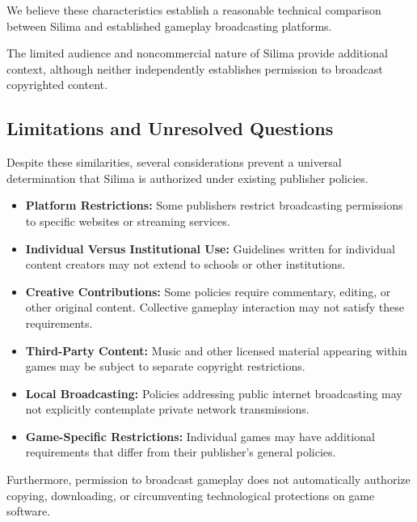We believe these characteristics establish a reasonable
technical comparison between Silima and established
gameplay broadcasting platforms.

The limited audience and noncommercial nature of Silima
provide additional context, although neither independently
establishes permission to broadcast copyrighted content.

\subsection{Limitations and Unresolved Questions}

Despite these similarities, several considerations
prevent a universal determination that Silima is
authorized under existing publisher policies.

\begin{itemize}
    \item \textbf{Platform Restrictions:}
    Some publishers restrict broadcasting permissions
    to specific websites or streaming services.

    \item \textbf{Individual Versus Institutional Use:}
    Guidelines written for individual content creators
    may not extend to schools or other institutions.

    \item \textbf{Creative Contributions:}
    Some policies require commentary, editing, or other
    original content. Collective gameplay interaction
    may not satisfy these requirements.

    \item \textbf{Third-Party Content:}
    Music and other licensed material appearing within
    games may be subject to separate copyright
    restrictions.

    \item \textbf{Local Broadcasting:}
    Policies addressing public internet broadcasting
    may not explicitly contemplate private network
    transmissions.

    \item \textbf{Game-Specific Restrictions:}
    Individual games may have additional requirements
    that differ from their publisher's general policies.
\end{itemize}

Furthermore, permission to broadcast gameplay does not
automatically authorize copying, downloading, or
circumventing technological protections on game software.

